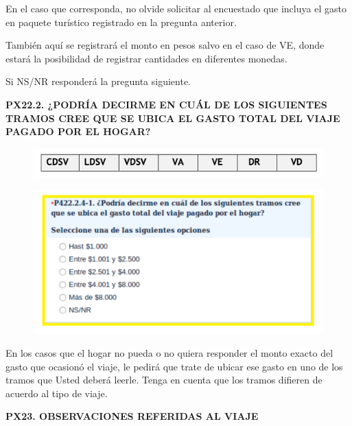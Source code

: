 \documentclass[
  openany]{book}
\begin{document}
En el caso que corresponda, no olvide solicitar al encuestado que incluya el gasto en paquete turístico registrado en la pregunta anterior.

También aquí se registrará el monto en pesos salvo en el caso de VE, donde estará la posibilidad de registrar cantidades en diferentes monedas.

Si NS/NR responderá la pregunta siguiente.

\textbf{PX22.2. ¿PODRÍA DECIRME EN CUÁL DE LOS SIGUIENTES TRAMOS CREE QUE SE UBICA EL GASTO TOTAL DEL VIAJE PAGADO POR EL HOGAR?}

\begin{figure}

{\centering \includegraphics[width=1\linewidth]{imagenes/figura6-125} 

}

\end{figure}

\begin{figure}

{\centering \includegraphics[width=1\linewidth]{imagenes/figura6-126} 

}

\end{figure}

En los casos que el hogar no pueda o no quiera responder el monto exacto del gasto que ocasionó el viaje, le pedirá que trate de ubicar ese gasto en uno de los tramos que Usted deberá leerle. Tenga en cuenta que los tramos difieren de acuerdo al tipo de viaje.

\textbf{PX23. OBSERVACIONES REFERIDAS AL VIAJE}
\end{document}
